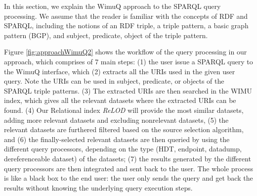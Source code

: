 In this section, we explain the WimuQ approach to the SPARQL query processing. We assume that the reader is familiar with the concepts of RDF and SPARQL, including the notions of an RDF triple, a triple pattern, a basic graph pattern (BGP), and subject, predicate, object of the triple pattern. 

Figure \ref{fig:approachWimuQ2} shows the workflow of the query processing in our approach, which comprises of 7 main steps: (1) the user issue a SPARQL query to the WimuQ interface, which (2) extracts all the URIs used in the given user query. Note the URIs can be used in subject, predicate, or objects of the SPARQL triple patterns. (3) The extracted URIs are then searched in the WIMU index, which gives all the relevant datasets where the extracted URIs can be found. (4) Our Relational index \emph{ReLOD}\cite{valdestilhasSWJ2020} will provide the most similar datasets, adding more relevant datasets and excluding nonrelevant datasets, (5) the relevant datasets are furthered filtered based on the source selection algorithm, and (6) the finally-selected relevant datasets are then queried by using the different query processors, depending on the type (HDT, endpoint, datadump, dereferenceable dataset) of the datasets; (7) the results generated by the different query processors are then integrated and sent back to the user. The whole process is like a black box to the end user: the user only sends the query and get back the results without knowing the underlying query execution steps.


